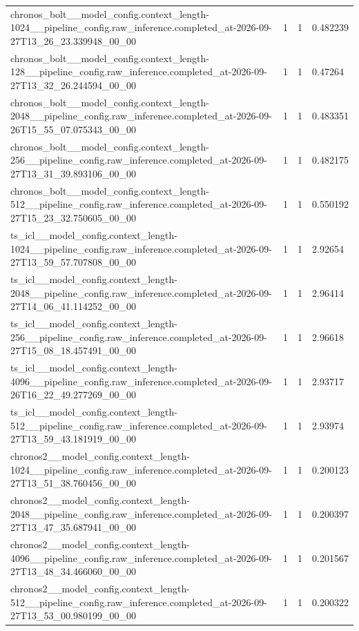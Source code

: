 \begin{tabular}{llll}
chronos\_bolt\_\_model\_config.context\_length-1024\_\_pipeline\_config.raw\_inference.completed\_at-2026-09-27T13\_26\_23.339948\_00\_00 & 1 & 1 & 0.482239 \\
chronos\_bolt\_\_model\_config.context\_length-128\_\_pipeline\_config.raw\_inference.completed\_at-2026-09-27T13\_32\_26.244594\_00\_00 & 1 & 1 & 0.47264 \\
chronos\_bolt\_\_model\_config.context\_length-2048\_\_pipeline\_config.raw\_inference.completed\_at-2026-09-26T15\_55\_07.075343\_00\_00 & 1 & 1 & 0.483351 \\
chronos\_bolt\_\_model\_config.context\_length-256\_\_pipeline\_config.raw\_inference.completed\_at-2026-09-27T13\_31\_39.893106\_00\_00 & 1 & 1 & 0.482175 \\
chronos\_bolt\_\_model\_config.context\_length-512\_\_pipeline\_config.raw\_inference.completed\_at-2026-09-27T15\_23\_32.750605\_00\_00 & 1 & 1 & 0.550192 \\
ts\_icl\_\_model\_config.context\_length-1024\_\_pipeline\_config.raw\_inference.completed\_at-2026-09-27T13\_59\_57.707808\_00\_00 & 1 & 1 & 2.92654 \\
ts\_icl\_\_model\_config.context\_length-2048\_\_pipeline\_config.raw\_inference.completed\_at-2026-09-27T14\_06\_41.114252\_00\_00 & 1 & 1 & 2.96414 \\
ts\_icl\_\_model\_config.context\_length-256\_\_pipeline\_config.raw\_inference.completed\_at-2026-09-27T15\_08\_18.457491\_00\_00 & 1 & 1 & 2.96618 \\
ts\_icl\_\_model\_config.context\_length-4096\_\_pipeline\_config.raw\_inference.completed\_at-2026-09-26T16\_22\_49.277269\_00\_00 & 1 & 1 & 2.93717 \\
ts\_icl\_\_model\_config.context\_length-512\_\_pipeline\_config.raw\_inference.completed\_at-2026-09-27T13\_59\_43.181919\_00\_00 & 1 & 1 & 2.93974 \\
chronos2\_\_model\_config.context\_length-1024\_\_pipeline\_config.raw\_inference.completed\_at-2026-09-27T13\_51\_38.760456\_00\_00 & 1 & 1 & 0.200123 \\
chronos2\_\_model\_config.context\_length-2048\_\_pipeline\_config.raw\_inference.completed\_at-2026-09-27T13\_47\_35.687941\_00\_00 & 1 & 1 & 0.200397 \\
chronos2\_\_model\_config.context\_length-4096\_\_pipeline\_config.raw\_inference.completed\_at-2026-09-27T13\_48\_34.466060\_00\_00 & 1 & 1 & 0.201567 \\
chronos2\_\_model\_config.context\_length-512\_\_pipeline\_config.raw\_inference.completed\_at-2026-09-27T13\_53\_00.980199\_00\_00 & 1 & 1 & 0.200322 \\

\end{tabular}
